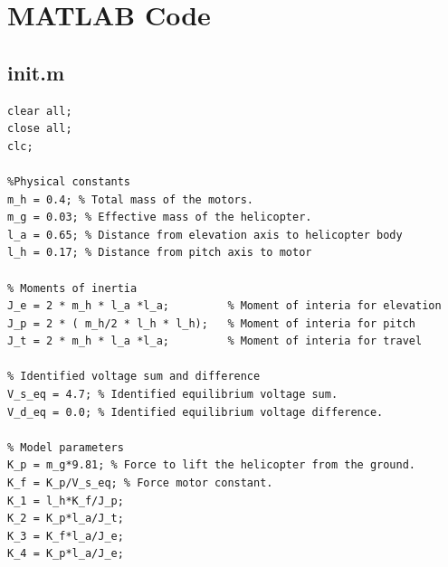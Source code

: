 \clearpage
\section{MATLAB Code}\label{sec:code}

\sloppy
{}
\setlength{\parindent}{0pt}

    
\subsection{init.m}\label{sec:init}
\begin{verbatim}
clear all;
close all;
clc;

%Physical constants
m_h = 0.4; % Total mass of the motors.
m_g = 0.03; % Effective mass of the helicopter.
l_a = 0.65; % Distance from elevation axis to helicopter body
l_h = 0.17; % Distance from pitch axis to motor

% Moments of inertia
J_e = 2 * m_h * l_a *l_a;         % Moment of interia for elevation
J_p = 2 * ( m_h/2 * l_h * l_h);   % Moment of interia for pitch
J_t = 2 * m_h * l_a *l_a;         % Moment of interia for travel

% Identified voltage sum and difference
V_s_eq = 4.7; % Identified equilibrium voltage sum.
V_d_eq = 0.0; % Identified equilibrium voltage difference.

% Model parameters
K_p = m_g*9.81; % Force to lift the helicopter from the ground.
K_f = K_p/V_s_eq; % Force motor constant.
K_1 = l_h*K_f/J_p;
K_2 = K_p*l_a/J_t;
K_3 = K_f*l_a/J_e;
K_4 = K_p*l_a/J_e;
\end{verbatim}

